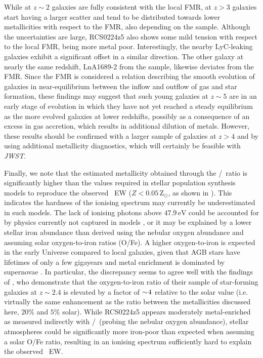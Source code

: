 While at $z \sim 2$ galaxies are fully consistent with the local FMR, at $z > 3$ galaxies start having a larger scatter and tend to be distributed towards lower metallicities with respect to the FMR, also depending on the sample. Although the uncertainties are large, RCS0224z5 also shows some mild tension with respect to the local FMR, being more metal poor. Interestingly, the nearby LyC-leaking galaxies exhibit a significant offset in a similar direction. The other galaxy at nearly the same redshift, LnA1689-2 from the \citeauthor{2014A&A...563A..58T} sample, likewise deviates from the FMR. Since the FMR is considered a relation describing the smooth evolution of galaxies in near-equilibrium between the inflow and outflow of gas and star formation, these findings may suggest that such young galaxies at $z \sim 5$ are in an early stage of evolution in which they have not yet reached a steady equilibrium as the more evolved galaxies at lower redshifts, possibly as a consequence of an excess in gas accretion, which results in additional dilution of metals. However, these results should be confirmed with a larger sample of galaxies at $z > 4$ and by using additional metallicity diagnostics, which will certainly be feasible with \textit{JWST}.

Finally, we note that the estimated metallicity obtained through the \NeIII/\OII\ ratio is significantly higher than the values required in stellar population synthesis models to reproduce the observed \CIV\ EW ($Z < 0.05 \, \mathrm{Z_\odot}$, as shown in \citealt{2017MNRAS.467.3306S}). This indicates the hardness of the ionising spectrum may currently be underestimated in such models. The lack of ionising photons above $47.9 \, \mathrm{eV}$ could be accounted for by physics currently not captured in models \citep[e.g. stars stripped in binaries,][]{2019A&A...629A.134G}, or it may be explained by a lower stellar iron abundance than derived using the nebular oxygen abundance and assuming solar oxygen-to-iron ratios (O/Fe). A higher oxygen-to-iron is expected in the early Universe compared to local galaxies, given that AGB stars have lifetimes of only a few gigayears and metal enrichment is dominated by supernovae . In particular, the discrepancy seems to agree well with the findings of \citet{2016ApJ...826..159S}, who demonstrate that the oxygen-to-iron ratio of their sample of star-forming galaxies at $z \sim 2.4$ is elevated by a factor of $\sim \! 4$ relative to the solar value (i.e. virtually the same enhancement as the ratio between the metallicities discussed here, $20\%$ and $5\%$ solar). While RCS0224z5 appears moderately metal-enriched as measured indirectly with \NeIII/\OII\ (probing the nebular oxygen abundance), stellar atmospheres could be significantly more iron-poor than expected when assuming a solar O/Fe ratio, resulting in an ionising spectrum sufficiently hard to explain the observed \CIV\ EW.

